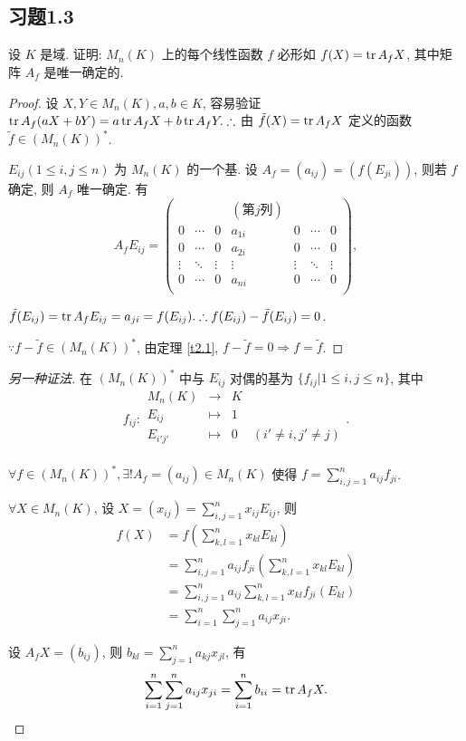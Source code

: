 \documentclass[color=black,device=normal,lang=cn,mode=geye]{elegantnote}
\begin{document}
\subsection{习题1.3}
\begin{exercise}\label{ex3.1}
    设 $K$ 是域. 证明: $M_n(K)$ 上的每个线性函数 $f$ 必形如 $f(X)=\operatorname{tr} A_fX$, 其中矩阵 $A_f$ 是唯一确定的.
\end{exercise}
\begin{proof}
    设 $X,Y\in M_n(K),a,b\in K$, 容易验证 $\operatorname{tr} A_f(aX+bY)=a\operatorname{tr} A_fX+b\operatorname{tr} A_fY.\therefore$ 由 $\tilde{f}(X)=\operatorname{tr} A_fX$ 定义的函数 $\tilde{f}\in(M_n(K))^*$.

    $E_{ij}(1\leq i,j\leq n)$ 为 $M_n(K)$ 的一个基. 设 $A_f=(a_{ij})=(f(E_{ji}))$, 则若 $f$ 确定, 则 $A_f$ 唯一确定. 有
    \[A_fE_{ij}=\begin{pmatrix}
               &        &        & (\text{第}j\text{列}) \\
        0      & \cdots & 0      & a_{1i} & 0      & \cdots & 0 \\
        0      & \cdots & 0      & a_{2i} & 0      & \cdots & 0 \\
        \vdots & \ddots & \vdots & \vdots & \vdots & \ddots & \vdots \\
        0      & \cdots & 0      & a_{ni} & 0      & \cdots & 0 \\
    \end{pmatrix},\]

    $\tilde{f}(E_{ij})=\operatorname{tr} A_fE_{ij}=a_{ji}=f(E_{ij}).\therefore f(E_{ij})-\tilde{f}(E_{ij})=0$.
    
    $\because f-\tilde{f}\in(M_n(K))^*$, 由定理 \ref{t2.1}, $f-\tilde{f}=0\Rightarrow f=\tilde{f}$.
\end{proof}
\begin{proof}[另一种证法]
    在 $(M_n(K))^*$ 中与 $E_{ij}$ 对偶的基为 $\{f_{ij}|1\leq i,j\leq n\}$, 其中
    \[f_{ij}:\begin{array}{rcll}
        M_n(K) & \to & K \\
        E_{ij} & \mapsto & 1 \\
        E_{i'j'} & \mapsto & 0 & (i'\neq i,j'\neq j) \\
    \end{array}.\]

    $\forall f\in(M_n(K))^*,\exists!A_f=(a_{ij})\in M_n(K)$ 使得 $f=\sum\limits_{i,j=1}^na_{ij}f_{ji}$.

    $\forall X\in M_n(K)$, 设 $X=(x_{ij})=\sum\limits_{i,j=1}^nx_{ij}E_{ij}$, 则
    \begin{align*}
        f(X) & =f\left(\sum\limits_{k,l=1}^nx_{kl}E_{kl}\right) \\
        & =\sum\limits_{i,j=1}^na_{ij}f_{ji}\left(\sum\limits_{k,l=1}^nx_{kl}E_{kl}\right) \\
        & =\sum\limits_{i,j=1}^na_{ij}\sum\limits_{k,l=1}^nx_{kl}f_{ji}(E_{kl}) \\
        & =\sum\limits_{i=1}^n\sum\limits_{j=1}^na_{ij}x_{ji}.
    \end{align*}

    设 $A_fX=(b_{ij})$, 则 $b_{kl}=\sum\limits_{j=1}^na_{kj}x_{jl}$, 有
    \[\sum\limits_{i=1}^n\sum\limits_{j=1}^na_{ij}x_{ji}=\sum\limits_{i=1}^nb_{ii}=\operatorname{tr} A_fX.\qedhere\]
\end{proof}
\end{document}
